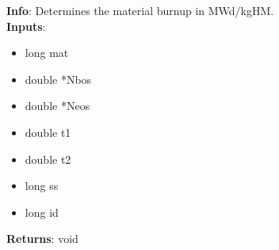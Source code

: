 \textbf{Info}: Determines the material burnup in MWd/kgHM. \\

\noindent \textbf{Inputs}:
\begin{itemize}
\item{long mat}
\item{double *Nbos}
\item{double *Neos}
\item{double t1}
\item{double t2}
\item{long ss}
\item{long id}
\end{itemize}

\noindent \textbf{Returns}: void
